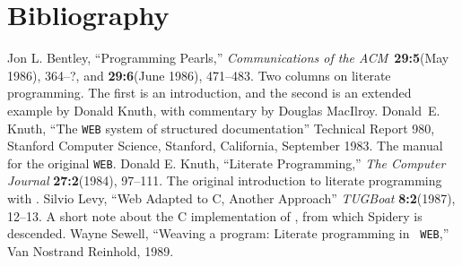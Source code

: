 \section{Bibliography}
\begin{thebibliography}{Knuth~999}
Jon L. Bentley, ``Programming Pearls,'' {\sl Communications of the
ACM}~{\bf 29:5}(May 1986), 364--?, and {\bf 29:6}(June 1986),
471--483.
Two columns on literate programming.
The first is an introduction, and the second is an extended example by
Donald Knuth, with commentary by Douglas MacIlroy.
Donald~E. Knuth,
``The {{\tt WEB}} system of structured documentation''
 Technical Report 980, Stanford Computer Science, Stanford,
  California, September 1983.
The manual for the original {\tt WEB}.
Donald E. Knuth, ``Literate Programming,'' {\sl The Computer Journal}
{\bf 27:2}(1984), 97--111.
The original introduction to literate programming with {\WEB}.
Silvio Levy, ``Web Adapted to C, Another Approach'' {\sl TUGBoat}
{\bf 8:2}(1987), 12--13.
A short note about the C implementation of {\WEB}, from which Spidery
{\WEB} is descended.
Wayne Sewell, ``Weaving a program: Literate programming in {\tt
WEB},''
Van Nostrand Reinhold, 1989.
\end{thebibliography}



